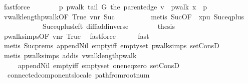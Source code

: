 \begin{isabellebody}
\ fastforce\isanewline
\ \ \ \ \ \ \isamarkupfalse%
\ {\isachardoublequoteopen}{\isasymexists}p{\isachardot}\ pwalk\ {\isacharparenleft}tail\ G\ {\isacharparenleft}the\ {\isacharparenleft}parent{\isacharunderscore}edge\ v{\isacharparenright}{\isacharparenright}{\isacharparenright}\ {\isacharequal}\ pwalk\ x\ {\isacharat}\ p{\isachardoublequoteclose}\isanewline
\ \ \ \ \ \ \ \ \isamarkupfalse%
\ vwalk{\isacharunderscore}length{\isacharunderscore}pwalk{\isacharbrackleft}OF\ True\ vnr{\isacharbrackright}\ Suc{\isacharparenleft}{}{\isacharparenright}\isanewline
\ \ \ \ \ \ \ \ \isamarkupfalse%
\ {\isacharparenleft}metis\ Suc{\isacharparenleft}{}{\isacharparenright}{\isacharbrackleft}OF\ {\isacharunderscore}\ xpu{\isacharbrackright}\ Suc{\isacharunderscore}eq{\isacharunderscore}plus{}\ \isanewline
\ \ \ \ \ \ \ \ \ \ \ \ Suc{\isacharunderscore}eq{\isacharunderscore}plus{}{\isacharunderscore}left\ diff{\isacharunderscore}add{\isacharunderscore}inverse{\isacharparenright}\isanewline
\ \ \ \ \ \ \isamarkupfalse%
\ {\isacharquery}thesis\ \isamarkupfalse%
\ pwalk{\isacharunderscore}simps{\isacharparenleft}{}{\isacharparenright}{\isacharbrackleft}OF\ vnr\ True{\isacharbrackright}\ \isamarkupfalse%
\ fastforce\isanewline
\ \ \ \ \isamarkupfalse%
\ fast\isanewline
\ \ \isamarkupfalse%
\ {\isacharparenleft}metis\ Suc{\isachardot}prems\ append{\isacharunderscore}Nil{}\ empty{\isacharunderscore}iff\ empty{\isacharunderscore}set\ pwalk{\isacharunderscore}simps{\isacharparenleft}{}{\isacharparenright}\ set{\isacharunderscore}ConsD{\isacharparenright}\isanewline
{}\isamarkupfalse%
\ {\isacharparenleft}metis\ pwalk{\isacharunderscore}simps{\isacharparenleft}{}{\isacharparenright}\ add{\isacharunderscore}is{\isacharunderscore}{}\ vwalk{\isacharunderscore}length{\isacharunderscore}pwalk\isanewline
\ \ \ \ \ append{\isacharunderscore}Nil{}\ empty{\isacharunderscore}iff\ empty{\isacharunderscore}set\ one{\isacharunderscore}neq{\isacharunderscore}zero\ set{\isacharunderscore}ConsD{\isacharparenright}%
\endisatagproof
{\isafoldproof}%
%
\isadelimproof
\isanewline
%
\endisadelimproof
\isanewline
{}\isamarkupfalse%
\ {\isacharparenleft}\ connected{\isacharunderscore}components{\isacharunderscore}locale{\isacharparenright}\ path{\isacharunderscore}from{\isacharunderscore}root{\isacharunderscore}num{\isacharcolon}\isanewline

\end{isabellebody}

